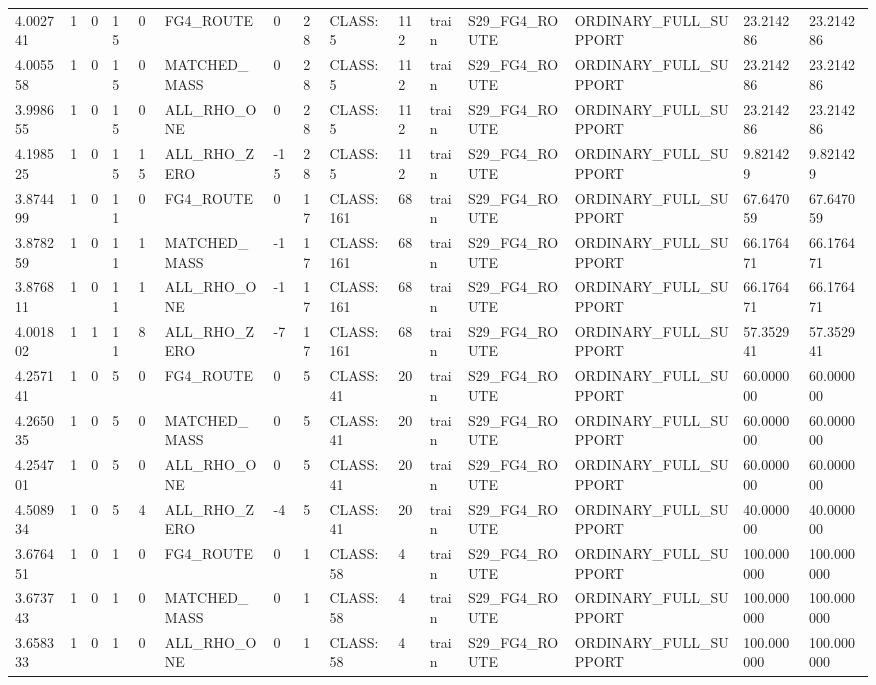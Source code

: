 \begin{tabular}{lllllllllllllll}
4.002741 & 1 & 0 & 15 & 0 & FG4\_ROUTE & 0 & 28 & CLASS:5 & 112 & train & S29\_FG4\_ROUTE & ORDINARY\_FULL\_SUPPORT & 23.214286 & 23.214286 \\
4.005558 & 1 & 0 & 15 & 0 & MATCHED\_MASS & 0 & 28 & CLASS:5 & 112 & train & S29\_FG4\_ROUTE & ORDINARY\_FULL\_SUPPORT & 23.214286 & 23.214286 \\
3.998655 & 1 & 0 & 15 & 0 & ALL\_RHO\_ONE & 0 & 28 & CLASS:5 & 112 & train & S29\_FG4\_ROUTE & ORDINARY\_FULL\_SUPPORT & 23.214286 & 23.214286 \\
4.198525 & 1 & 0 & 15 & 15 & ALL\_RHO\_ZERO & -15 & 28 & CLASS:5 & 112 & train & S29\_FG4\_ROUTE & ORDINARY\_FULL\_SUPPORT & 9.821429 & 9.821429 \\
3.874499 & 1 & 0 & 11 & 0 & FG4\_ROUTE & 0 & 17 & CLASS:161 & 68 & train & S29\_FG4\_ROUTE & ORDINARY\_FULL\_SUPPORT & 67.647059 & 67.647059 \\
3.878259 & 1 & 0 & 11 & 1 & MATCHED\_MASS & -1 & 17 & CLASS:161 & 68 & train & S29\_FG4\_ROUTE & ORDINARY\_FULL\_SUPPORT & 66.176471 & 66.176471 \\
3.876811 & 1 & 0 & 11 & 1 & ALL\_RHO\_ONE & -1 & 17 & CLASS:161 & 68 & train & S29\_FG4\_ROUTE & ORDINARY\_FULL\_SUPPORT & 66.176471 & 66.176471 \\
4.001802 & 1 & 1 & 11 & 8 & ALL\_RHO\_ZERO & -7 & 17 & CLASS:161 & 68 & train & S29\_FG4\_ROUTE & ORDINARY\_FULL\_SUPPORT & 57.352941 & 57.352941 \\
4.257141 & 1 & 0 & 5 & 0 & FG4\_ROUTE & 0 & 5 & CLASS:41 & 20 & train & S29\_FG4\_ROUTE & ORDINARY\_FULL\_SUPPORT & 60.000000 & 60.000000 \\
4.265035 & 1 & 0 & 5 & 0 & MATCHED\_MASS & 0 & 5 & CLASS:41 & 20 & train & S29\_FG4\_ROUTE & ORDINARY\_FULL\_SUPPORT & 60.000000 & 60.000000 \\
4.254701 & 1 & 0 & 5 & 0 & ALL\_RHO\_ONE & 0 & 5 & CLASS:41 & 20 & train & S29\_FG4\_ROUTE & ORDINARY\_FULL\_SUPPORT & 60.000000 & 60.000000 \\
4.508934 & 1 & 0 & 5 & 4 & ALL\_RHO\_ZERO & -4 & 5 & CLASS:41 & 20 & train & S29\_FG4\_ROUTE & ORDINARY\_FULL\_SUPPORT & 40.000000 & 40.000000 \\
3.676451 & 1 & 0 & 1 & 0 & FG4\_ROUTE & 0 & 1 & CLASS:58 & 4 & train & S29\_FG4\_ROUTE & ORDINARY\_FULL\_SUPPORT & 100.000000 & 100.000000 \\
3.673743 & 1 & 0 & 1 & 0 & MATCHED\_MASS & 0 & 1 & CLASS:58 & 4 & train & S29\_FG4\_ROUTE & ORDINARY\_FULL\_SUPPORT & 100.000000 & 100.000000 \\
3.658333 & 1 & 0 & 1 & 0 & ALL\_RHO\_ONE & 0 & 1 & CLASS:58 & 4 & train & S29\_FG4\_ROUTE & ORDINARY\_FULL\_SUPPORT & 100.000000 & 100.000000 \\

\end{tabular}
